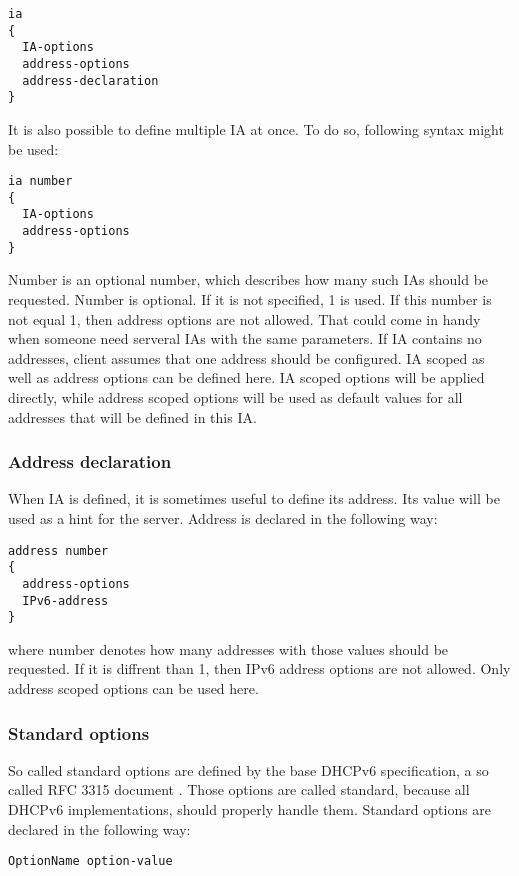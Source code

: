 \begin{verbatim}
ia
{ 
  IA-options
  address-options
  address-declaration
}
\end{verbatim}

It is also possible to define multiple IA at once. To do so, following
syntax might be used:

\begin{verbatim}
ia number
{ 
  IA-options
  address-options
}
\end{verbatim}
Number is an optional number, which describes how many such IAs
should be requested. Number is optional. If it is not specified, 1 is
used. If this number is not equal 1, then address options are not
allowed. That could come in handy when someone need serveral IAs with
the same parameters. If IA contains no addresses, client assumes that
one address should be configured. IA scoped as well as address options
can be defined here. IA scoped options will be applied directly, while
address scoped options will be used as default values for all addresses
that will be defined in this IA. 

\subsubsection{Address declaration}
When IA is defined, it is sometimes useful to define its address. Its
value will be used as a hint for the server. Address is declared in the
following way:

\begin{verbatim}
address number
{ 
  address-options
  IPv6-address
}
\end{verbatim}
where number denotes how many addresses with those values should be
requested. If it is diffrent than 1, then IPv6 address options are not
allowed. Only address scoped options can be used here.

\subsubsection{Standard options}
So called standard options are defined by the base DHCPv6
specification, a so called RFC 3315 document \cite{rfc3315}. Those options are
called standard, because all DHCPv6 implementations, should properly
handle them. Standard options are declared in the following way:

\begin{verbatim}
OptionName option-value
\end{verbatim}

